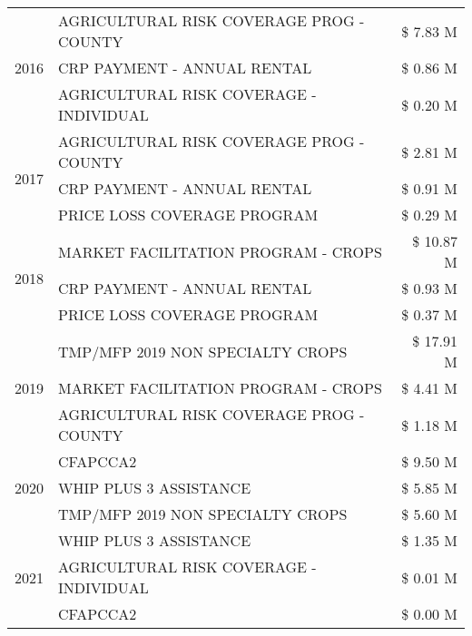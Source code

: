 \begin{tabular}{llr}
\cline{1-3}
\multirow[t]{3}{*}{2016} & AGRICULTURAL RISK COVERAGE PROG - COUNTY & \$ 7.83 M \\
 & CRP PAYMENT - ANNUAL RENTAL & \$ 0.86 M \\
 & AGRICULTURAL RISK COVERAGE - INDIVIDUAL & \$ 0.20 M \\
\cline{1-3}
\multirow[t]{3}{*}{2017} & AGRICULTURAL RISK COVERAGE PROG - COUNTY & \$ 2.81 M \\
 & CRP PAYMENT - ANNUAL RENTAL & \$ 0.91 M \\
 & PRICE LOSS COVERAGE PROGRAM & \$ 0.29 M \\
\cline{1-3}
\multirow[t]{3}{*}{2018} & MARKET FACILITATION PROGRAM - CROPS & \$ 10.87 M \\
 & CRP PAYMENT - ANNUAL RENTAL & \$ 0.93 M \\
 & PRICE LOSS COVERAGE PROGRAM & \$ 0.37 M \\
\cline{1-3}
\multirow[t]{3}{*}{2019} & TMP/MFP 2019 NON SPECIALTY CROPS & \$ 17.91 M \\
 & MARKET FACILITATION PROGRAM - CROPS & \$ 4.41 M \\
 & AGRICULTURAL RISK COVERAGE PROG - COUNTY & \$ 1.18 M \\
\cline{1-3}
\multirow[t]{3}{*}{2020} & CFAPCCA2 & \$ 9.50 M \\
 & WHIP PLUS 3 ASSISTANCE & \$ 5.85 M \\
 & TMP/MFP 2019 NON SPECIALTY CROPS & \$ 5.60 M \\
\cline{1-3}
\multirow[t]{3}{*}{2021} & WHIP PLUS 3 ASSISTANCE & \$ 1.35 M \\
 & AGRICULTURAL RISK COVERAGE - INDIVIDUAL & \$ 0.01 M \\
 & CFAPCCA2 & \$ 0.00 M \\
\cline{1-3}
\bottomrule
\end{tabular}
